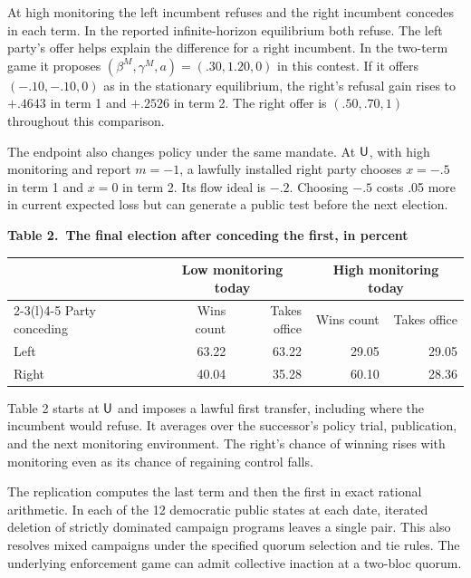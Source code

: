 \documentclass[11pt,letterpaper]{article}
\begin{document}
At high monitoring the left incumbent refuses and the right incumbent concedes in each term. In the reported infinite-horizon equilibrium both refuse. The left party's offer helps explain the difference for a right incumbent. In the two-term game it proposes \((\beta^M,\gamma^M,a)=(.30,1.20,0)\) in this contest. If it offers \((-.10,-.10,0)\) as in the stationary equilibrium, the right's refusal gain rises to \(+.4643\) in term 1 and \(+.2526\) in term 2. The right offer is \((.50,.70,1)\) throughout this comparison.

The endpoint also changes policy under the same mandate. At \(\mathsf U\), with high monitoring and report \(m=-1\), a lawfully installed right party chooses \(x=-.5\) in term 1 and \(x=0\) in term 2. Its flow ideal is \(-.2\). Choosing \(-.5\) costs .05 more in current expected loss but can generate a public test before the next election.

\begin{center}\small
\textbf{Table 2.\ The final election after conceding the first, in percent}\\[5pt]
\begin{tabular}{@{}l rr rr@{}}\toprule
 &\multicolumn{2}{c}{Low monitoring today}&\multicolumn{2}{c}{High monitoring today}\\
\cmidrule(lr){2-3}\cmidrule(l){4-5}
Party conceding & Wins count & Takes office & Wins count & Takes office\\\midrule
Left  & 63.22 & 63.22 & 29.05 & 29.05\\
Right & 40.04 & 35.28 & 60.10 & 28.36\\\bottomrule
\end{tabular}
\end{center}

Table 2 starts at \(\mathsf U\) and imposes a lawful first transfer, including where the incumbent would refuse. It averages over the successor's policy trial, publication, and the next monitoring environment. The right's chance of winning rises with monitoring even as its chance of regaining control falls.

The replication computes the last term and then the first in exact rational arithmetic. In each of the 12 democratic public states at each date, iterated deletion of strictly dominated campaign programs leaves a single pair. This also resolves mixed campaigns under the specified quorum selection and tie rules. The underlying enforcement game can admit collective inaction at a two-bloc quorum.
\end{document}
